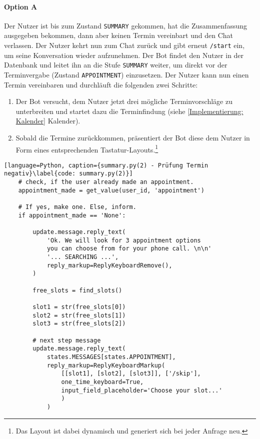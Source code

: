             \paragraph{Option A} Der Nutzer ist bis zum Zustand \verb|SUMMARY| gekommen, hat die Zusammenfassung ausgegeben bekommen, dann aber keinen Termin vereinbart und den Chat verlassen. Der Nutzer kehrt nun zum Chat zurück und gibt erneut \verb|/start| ein, um seine Konversation wieder aufzunehmen. Der Bot findet den Nutzer in der Datenbank und leitet ihn an die Stufe \verb|SUMMARY| weiter, um direkt vor der Terminvergabe (Zustand \verb|APPOINTMENT|) einzusetzen. Der Nutzer kann nun einen Termin vereinbaren und durchläuft die folgenden zwei Schritte: 
                \begin{enumerate}
                    \item Der Bot versucht, dem Nutzer jetzt drei mögliche Terminvorschläge zu unterbreiten und startet dazu die Terminfindung (siehe \ref{Implementierung: Kalender} Kalender).
                    \item Sobald die Termine zurückkommen, präsentiert der Bot diese dem Nutzer in Form eines entsprechenden Tastatur-Layouts.\footnote{Das Layout ist dabei dynamisch und generiert sich bei jeder Anfrage neu.}
                \end{enumerate}
            
            \begin{lstlisting}[language=Python, caption={summary.py(2) - Prüfung Termin negativ}\label{code: summary.py(2)}]
    # check, if the user already made an appointment. 
    appointment_made = get_value(user_id, 'appointment')
    
    # If yes, make one. Else, inform.
    if appointment_made == 'None':
        
        update.message.reply_text(
            'Ok. We will look for 3 appointment options 
            you can choose from for your phone call. \n\n'
            '... SEARCHING ...',
            reply_markup=ReplyKeyboardRemove(),
        )

        free_slots = find_slots()

        slot1 = str(free_slots[0])
        slot2 = str(free_slots[1])
        slot3 = str(free_slots[2])

        # next step message
        update.message.reply_text(
            states.MESSAGES[states.APPOINTMENT],
            reply_markup=ReplyKeyboardMarkup(
                [[slot1], [slot2], [slot3]], ['/skip'], 
                one_time_keyboard=True, 
                input_field_placeholder='Choose your slot...'
                )
            )
            \end{lstlisting}
            
